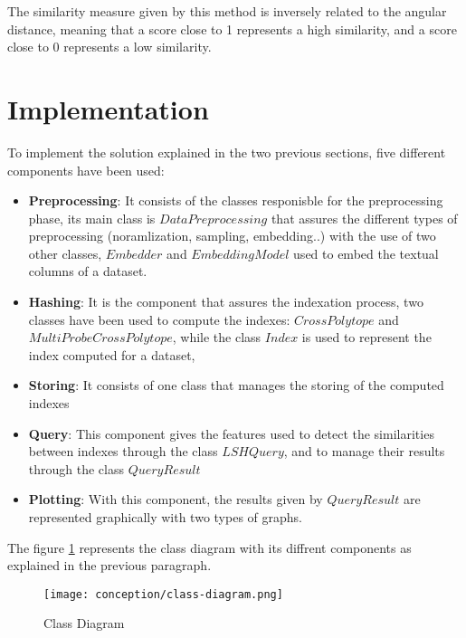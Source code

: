 The similarity measure given by this method is inversely related to the angular
distance, meaning that a score close to 1 represents a high similarity, and a
score close to 0 represents a low similarity.


\section{Implementation}
To implement the solution explained in the two previous sections, five different
components have been used:

\begin{itemize}
    \item \textbf{Preprocessing}: It consists of the classes responisble for the
    preprocessing phase, its main class is $DataPreprocessing$ that assures the
    different types of preprocessing (noramlization, sampling, embedding..) with
    the use of two other classes, $Embedder$ and $EmbeddingModel$ used to embed
    the textual columns of a dataset.
    \item \textbf{Hashing}: It is the component that assures the indexation
    process, two classes have been used to compute the indexes:
    $CrossPolytope$ and $MultiProbeCrossPolytope$, while the class $Index$ is
    used to represent the index computed for a dataset, 
    \item \textbf{Storing}: It consists of one class that manages the storing
    of the computed indexes
    \item \textbf{Query}: This component gives the features used to detect the
    similarities between indexes through the class $LSHQuery$, and to manage
    their results through the class $QueryResult$
    \item \textbf{Plotting}: With this component, the results given by
    $QueryResult$ are represented graphically with two types of graphs.
\end{itemize}

The figure \ref{fig:class_diagram} represents the class diagram with its
diffrent components as explained in the previous paragraph.

\begin{figure}[h]
    \centering
    \texttt{[image: conception/class-diagram.png]}
    \caption{Class Diagram}
    \label{fig:class_diagram}
\end{figure}